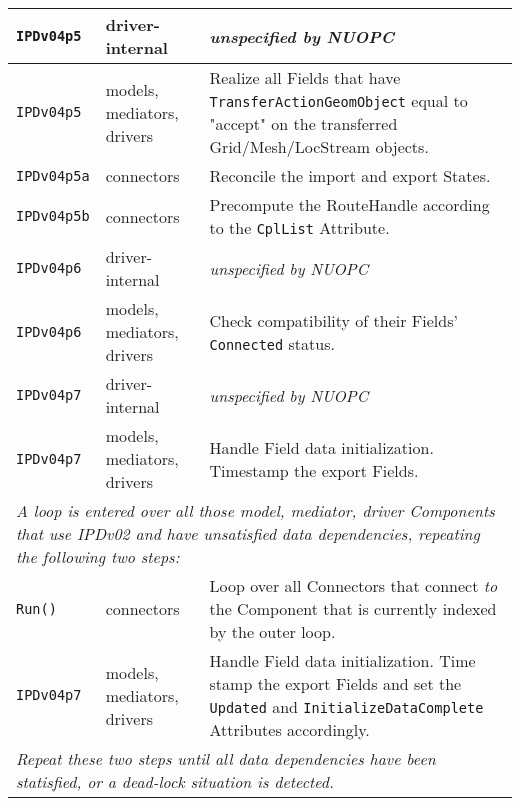 \begin{longtable}[h]{|p{}|p{}|p{}|}
     {\tt IPDv04p5}   & driver-internal             & {\em unspecified by NUOPC}\\ \hline
     {\tt IPDv04p5}   & models, mediators, drivers  & Realize all Fields that have {\tt TransferActionGeomObject} equal to "accept" on the transferred Grid/Mesh/LocStream objects.\\ \hline
     {\tt IPDv04p5a}  & connectors                  & Reconcile the import and export States.\\ \hline
     {\tt IPDv04p5b}  & connectors                  & Precompute the RouteHandle according to the {\tt CplList} Attribute.\\ \hline
     {\tt IPDv04p6}   & driver-internal             & {\em unspecified by NUOPC}\\ \hline
     {\tt IPDv04p6}   & models, mediators, drivers  & Check compatibility of their Fields' {\tt Connected} status.\\ \hline
     {\tt IPDv04p7}   & driver-internal             & {\em unspecified by NUOPC}\\ \hline
     {\tt IPDv04p7}   & models, mediators, drivers  & Handle Field data initialization. Timestamp the export Fields.\\ \hline
     \multicolumn{3}{|p{13.5cm}|}{\it A loop is entered over all those model, mediator, driver Components that use IPDv02 and have
     unsatisfied data dependencies, repeating the following two steps:}\\ \hline
     {\tt Run()}      & connectors                  & Loop over all Connectors that connect {\it to} the Component that is currently indexed by the outer loop.\\ \hline
     {\tt IPDv04p7}   & models, mediators, drivers  & Handle Field data initialization. Time stamp the export Fields and set the {\tt Updated} and {\tt InitializeDataComplete} Attributes accordingly.\\ \hline
     \multicolumn{3}{|p{13.5cm}|}{\it Repeat these two steps until all data
     dependencies have been statisfied, or a dead-lock situation is detected.}\\ 
     \hline\hline
\end{longtable}


